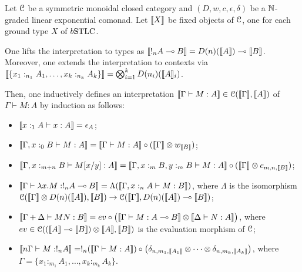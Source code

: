 \begin{definition}
Let $\mathcal{C}$ be a symmetric monoidal closed category and $(D, w,c,\epsilon,\delta)$ be a $\mathbb{N}$-graded linear exponential comonad. 
Let $\llbracket X\rrbracket$ be fixed objects of $\mathcal{C} $, one for each ground type $X$ of $\BSTLC$. 

One lifts the interpretation to types as 
$\llbracket!_{n}A\multimap B\rrbracket=D(n)(\llbracket A\rrbracket)\multimap \llbracket B\rrbracket$. Moreover, one extends the interpretation to contexts via %
$\llbracket\{x_{1}:_{n_{1}}A_{1},\dots, x_{k}:_{n_{k}}A_{k}\}\rrbracket=
\bigotimes_{i=1}^{k} D(n_i)(\llbracket A\rrbracket_i)$.

Then, one inductively defines an interpretation $\llbracket\Gamma \vdash M:A\rrbracket\in \mathcal{C}(\llbracket\Gamma\rrbracket, \llbracket A\rrbracket)$ of $\Gamma \vdash M:A$ by induction as follows:
 \begin{itemize}
\item $\llbracket x:_{1}A\vdash x: A\rrbracket=\epsilon_{A}$;
\item $\llbracket\Gamma,x:_{0}B\vdash M:A\rrbracket =
\llbracket\Gamma \vdash M:A\rrbracket
\circ (\llbracket\Gamma\rrbracket\otimes  w_{\llbracket B\rrbracket})
$;
\item $\llbracket\Gamma, x:_{m+n}B \vdash M[x/y]:A\rrbracket=
\llbracket\Gamma, x:_{m}B, y:_{m}B \vdash M:A\rrbracket
\circ
(\llbracket\Gamma\rrbracket \otimes c_{m,n,\llbracket B\rrbracket})
$;
\item $\llbracket\Gamma \vdash \lambda x.M: !_{n}A\multimap B\rrbracket=
\Lambda (\llbracket\Gamma, x:_{n}A \vdash M:B\rrbracket)
$, where $\Lambda$ is the isomorphism $ \mathcal{C}(\llbracket\Gamma\rrbracket \otimes D(n)(\llbracket A\rrbracket), \llbracket B\rrbracket) \to \mathcal{C}(\llbracket\Gamma\rrbracket, D(n)(\llbracket A\rrbracket)\multimap \llbracket B\rrbracket)$;

\item $\model{\Gamma+\Delta \vdash MN:B}=
\mathsf{ev}\circ \big( \model{\Gamma \vdash M:A\multimap B}
\otimes
\model{\Delta \vdash N:A}\big)$, where $\mathsf{ev}\in \C C((\model{A}\multimap \model B)\otimes \model A, \model B)$ is the evaluation morphism of $\mathcal{C}$;


\item $\llbracket n\Gamma\vdash M:!_{n}A\rrbracket=
 !_{n}(\llbracket\Gamma \vdash M:A\rrbracket)\circ \big(\delta_{n,m_{1},\llbracket A_{1}\rrbracket}\otimes \dots \otimes 
\delta_{n,m_{k},\llbracket A_{k}\rrbracket}\big)
$, where $\Gamma=\{x_{1}:_{m_{1}}A_{1},\dots, x_{k}:_{m_{k}}A_{k}\}$.

\end{itemize}
\end{definition}


